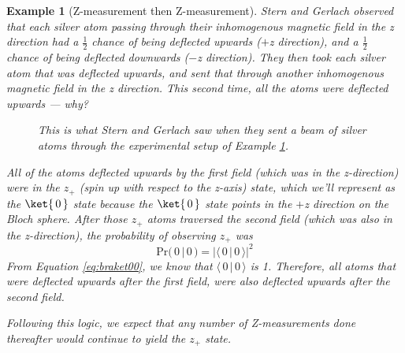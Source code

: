 \documentclass{article}
\newtheorem{example}{Example}
\theoremstyle{definition}
\newcommand{\abs}[1]{{\big\vert} #1 {\big\vert}}
\newcommand{\kz}[1]{\ket{\,#1\,}}
\begin{document}
\begin{example}[Z-measurement then Z-measurement] \label{example:sterngerlachzz}
Stern and Gerlach observed that each silver atom passing through their inhomogenous magnetic field in the z direction had a $\frac{1}{2}$ chance of being deflected upwards ($+$z direction), and a $\frac{1}{2}$ chance of being deflected downwards ($-$z direction).  They then took each silver atom that was deflected upwards, and sent that through another inhomogenous magnetic field in the z direction.  This second time, all the atoms were deflected upwards --- why?

\begin{figure}[H]
	\caption{This is what Stern and Gerlach saw when they sent a beam of silver atoms through the experimental setup of Example \ref{example:sterngerlachzz}.}
\end{figure}

\textnormal{All of the atoms deflected upwards by the first field (which was in the z-direction) were in the $z_+$ (spin up with respect to the z-axis) state, which we'll represent as the $\kz0$ state because the $\kz0$ state points in the $+$z direction on the Bloch sphere.  After those $z_+$ atoms traversed the second field (which was also in the z-direction), the probability of observing $z_+$ was
\begin{equation}
	\label{eq:prob00}
	\text{Pr}(\,0\,|\,0\,) = \abs{\langle\,0\,|\,0\,\rangle}^2
\end{equation}
From Equation \ref{eq:braket00}, we know that $\langle\,0\,|\,0\,\rangle$ is 1.  Therefore, all atoms that were deflected upwards after the first field, were also deflected upwards after the second field.}

\textnormal{Following this logic, we expect that any number of Z-measurements done thereafter would continue to yield the $z_+$ state.}
\end{example}
\end{document}
